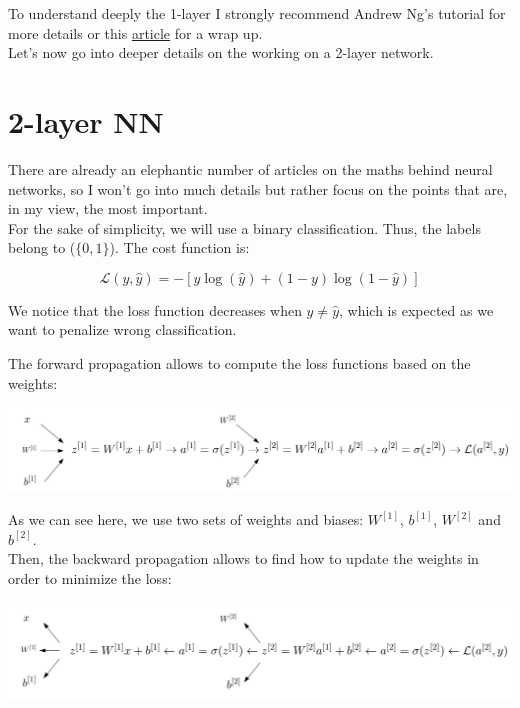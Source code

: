 To understand deeply the 1-layer I strongly recommend Andrew Ng's tutorial for more details or this \href{https://towardsdatascience.com/everything-you-need-to-know-about-neural-networks-and-backpropagation-machine-learning-made-easy-e5285bc2be3a}{article} for a wrap up. \\

Let's now go into deeper details on the working on a 2-layer network.

\section{2-layer NN}

There are already an elephantic number of articles on the maths behind neural networks, so I won't go into much details but rather focus on the points that are, in my view, the most important. \\

For the sake of simplicity, we will use a binary classification. Thus, the labels belong to ($\{0,1\}$). The cost function is:

$$\mathcal{L}(y, \widehat{y})=-[y\log(\widehat{y})+(1-y)\log(1-\widehat{y})]$$

We notice that the loss function decreases when $y \neq \widehat y$, which is expected as we want to penalize wrong classification.

The forward propagation allows to compute the loss functions based on the weights:

\begin{center}
\includegraphics[scale=0.3]{img/NN_2.png}
\end{center}

As we can see here, we use two sets of weights and biases: $W^{[1]}$, $b^{[1]}$, $W^{[2]}$ and $b^{[2]}$. \\

Then, the backward propagation allows to find how to update the weights in order to minimize the loss:

\begin{center}
\includegraphics[scale=0.3]{img/NN_2_backward.png}
\end{center}


